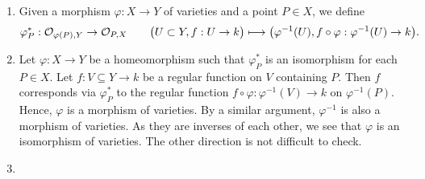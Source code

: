 \documentclass[10pt]{amsart}
\begin{document}
\begin{solution}
    \begin{luke}
        \begin{enumerate}
            \item Given a morphism $\varphi: X \to Y$ of varieties and a point $P \in X$, 
            we define
            \[
                \varphi_P^* : \mathcal{O}_{\varphi(P), Y} \to \mathcal{O}_{P, X} \qquad \big(U \subset Y, f: U \to k \big) \longmapsto 
                \big(\varphi^{-1}(U), f \circ \varphi: \varphi^{-1}(U) \to k\big).
            \]

            \item Let $\varphi: X \to Y$ be a homeomorphism such that $\varphi_P^{*}$ is an isomorphism 
            for each $P \in X$. Let
            $f: V \subseteq Y \to k$ be a regular function on $V$ containing $P$.
            Then $f$ corresponds via $\varphi_P^*$ to the regular function 
            $f \circ \varphi: \varphi^{-1}(V) \to k$ on $\varphi^{-1}(P)$. 
            Hence, $\varphi$ is a morphism of varieties. By a similar argument, $\varphi^{-1}$ is also a morphism of varieties. 
            As they are inverses of each other, we see that $\varphi$ is an isomorphism of varieties. 
            The other direction is not difficult to check.

            \item 
            
        \end{enumerate}
    \end{luke}
\end{solution}
\end{document}

